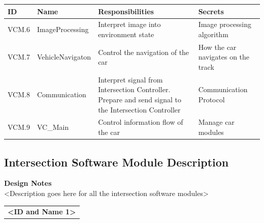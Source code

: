 \documentclass [10pt]{article}
\begin{document}
\begin{longtable}{ |p{ }  | p{ } |  p{ } |  p{ } |}  \hline
    
    \textbf{ID} & \textbf{Name} &  \textbf{Responsibilities} & \textbf{Secrets} \\ \hline
    
    \cellcolor{tableCell}VCM.6  &\cellcolor{tableCell}ImageProcessing &\cellcolor{tableCell}Interpret image into environment state &\cellcolor{tableCell}Image processing algorithm  \\ \hline
    
    VCM.7 & VehicleNavigaton & Control the navigation of the car & How the car navigates on the track \\ \hline
    
    \cellcolor{tableCell}VCM.8  & \cellcolor{tableCell}Communication & \cellcolor{tableCell}Interpret signal from Intersection Controller. Prepare and send signal to the Intersection Controller & \cellcolor{tableCell}Communication Protocol \\ \hline

    VCM.9 & VC\_Main & Control information flow of the car & Manage car modules \\ \hline
    
\end{longtable}

\subsection{Intersection Software Module Description}
\textbf{Design Notes} \\
<Description goes here for all the intersection software modules> \\

\begin{longtable}{p{}}
\rowcolor{tableCell}\textbf{<ID and Name 1>} \\
\end{longtable}
\end{document}
